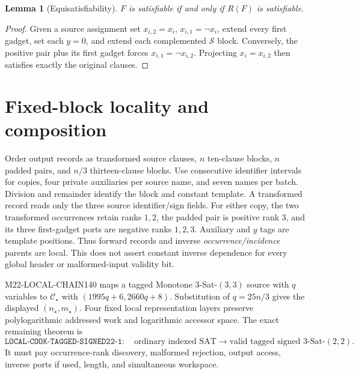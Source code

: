 \documentclass[11pt]{article}
\newtheorem{lemma}[theorem]{Lemma}
\begin{document}
\begin{lemma}[Equisatisfiability]
\(F\) is satisfiable if and only if \(R(F)\) is satisfiable.
\end{lemma}
\begin{proof}
Given a source assignment set \(x_{i,2}=x_i\),
\(x_{i,1}=\neg x_i\), extend every first gadget, set each \(y=0\), and
extend each complemented \(\mathcal S\) block.  Conversely, the positive
pair plus its first gadget forces \(x_{i,1}=\neg x_{i,2}\).  Projecting
\(x_i=x_{i,2}\) then satisfies exactly the original clauses.
\end{proof}

\section{Fixed-block locality and composition}
Order output records as transformed source clauses, \(n\) ten-clause blocks,
\(n\) padded pairs, and \(n/3\) thirteen-clause blocks.  Use consecutive
identifier intervals for copies, four private auxiliaries per source name,
and seven names per batch.  Division and remainder identify the block and
constant template.  A transformed record reads only the three source
identifier/sign fields.  For either copy, the two transformed occurrences
retain ranks \(1,2\), the padded pair is positive rank \(3\), and its three
first-gadget ports are negative ranks \(1,2,3\).  Auxiliary and \(y\) tags
are template positions.  Thus forward records and inverse
\emph{occurrence/incidence} parents are local.  This does not assert constant
inverse dependence for every global header or malformed-input validity bit.

M22-LOCAL-CHAIN140 maps a tagged Monotone 3-Sat-$(3,3)$ source with \(q\)
variables to \(\mathcal C_\star\) with
\((1995q+6,2660q+8)\).  Substitution of \(q=25n/3\) gives the displayed
\((n_\star,m_\star)\).  Four fixed local representation layers preserve
polylogarithmic addressed work and logarithmic accessor space.  The exact
remaining theorem is
\[
\texttt{LOCAL-COOK-TAGGED-SIGNED22-1}:
\quad\text{ordinary indexed SAT}\longrightarrow
\text{valid tagged signed 3-Sat-}(2,2).
\]
It must pay occurrence-rank discovery, malformed rejection, output access,
inverse ports if used, length, and simultaneous workspace.
\end{document}
